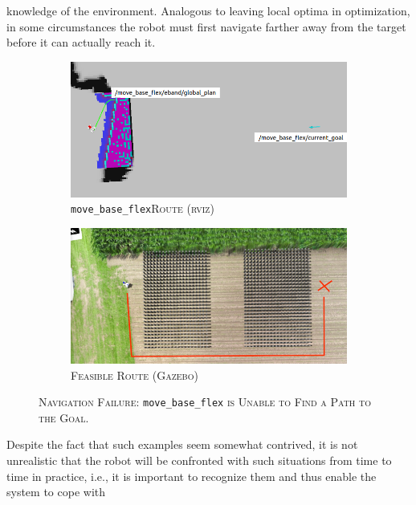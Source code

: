 \documentclass[english, master, utf8]{base/thesis_KBS}
\newcommand{\code}[1]{\colorbox{light-gray}{\texttt{#1}}}
\begin{document}
knowledge of the environment. Analogous to leaving local optima in optimization, in some circumstances the robot must first navigate farther away from the target before it can actually
reach it.
\begin{figure}[H]
    \centering
    \begin{subfigure}[b]{0.49\textwidth}
        \centering
        \includegraphics[width=\textwidth]{pics/nav_fail_wrong_route_0.png}
        \caption{\code{move\_base\_flex}\textsc{Route (rviz)}}
        \label{fig:nav_fail_rviz}
    \end{subfigure}
    \hfill
    \begin{subfigure}[b]{0.49\textwidth}
        \centering
        \includegraphics[width=\textwidth]{pics/nav_fail_wrong_route_1.png}
        \caption{\textsc{Feasible Route (Gazebo)}}
        \label{fig:nav_fail_gazebo}
    \end{subfigure}
\caption{\textsc{Navigation Failure:} \code{move\_base\_flex} \textsc{is Unable to Find a Path to the Goal.}}
\label{fig:nav_fail}
\end{figure}
Despite the fact that such examples seem somewhat contrived, it is not
unrealistic that the robot will be confronted with such situations from time to time in practice, i.e., it is important to recognize them and thus enable the system to cope with
\end{document}
